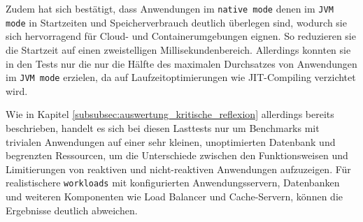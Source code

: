 Zudem hat sich bestätigt, dass Anwendungen im \verb|native mode| denen im \verb|JVM mode| in Startzeiten und Speicherverbrauch deutlich überlegen sind,
wodurch sie sich hervorragend für Cloud- und Containerumgebungen eignen. So reduzieren sie die Startzeit auf
einen zweistelligen Millisekundenbereich. Allerdings konnten sie in den Tests nur die nur die Hälfte des maximalen Durchsatzes von Anwendungen im
\verb|JVM mode| erzielen, da auf Laufzeitoptimierungen wie JIT-Compiling verzichtet wird.

Wie in Kapitel \ref{subsubsec:auswertung_kritische_reflexion} allerdings bereits beschrieben, handelt es sich bei diesen Lasttests nur um
Benchmarks mit trivialen Anwendungen auf einer sehr kleinen, unoptimierten Datenbank und begrenzten Ressourcen, um
die Unterschiede zwischen den Funktionsweisen und Limitierungen von reaktiven und nicht-reaktiven Anwendungen aufzuzeigen.
Für realistischere \verb|workloads| mit konfigurierten Anwendungsservern, Datenbanken und weiteren Komponenten wie Load Balancer und
Cache-Servern, können die Ergebnisse deutlich abweichen.